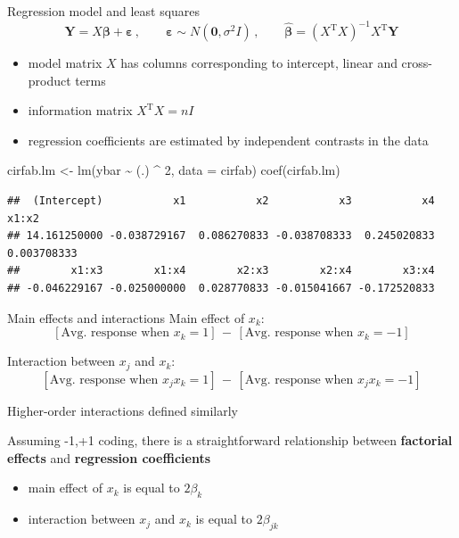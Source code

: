 \documentclass[
  ignorenonframetext,
]{beamer}
\newenvironment{Shaded}{\begin{snugshade}}{\end{snugshade}}
\newcommand{\AttributeTok}[1]{\textcolor[rgb]{0.77,0.63,0.00}{#1}}
\newcommand{\DecValTok}[1]{\textcolor[rgb]{0.00,0.00,0.81}{#1}}
\newcommand{\FunctionTok}[1]{\textcolor[rgb]{0.00,0.00,0.00}{#1}}
\newcommand{\NormalTok}[1]{#1}
\newcommand{\OtherTok}[1]{\textcolor[rgb]{0.56,0.35,0.01}{#1}}
\newcommand{\SpecialCharTok}[1]{\textcolor[rgb]{0.00,0.00,0.00}{#1}}
\providecommand{\tightlist}{%
  \setlength{\itemsep}{0pt}\setlength{\parskip}{0pt}}
\begin{document}
\begin{frame}[fragile]{Regression model and least squares}
\protect\hypertarget{regression-model-and-least-squares}{}
\[
\boldsymbol{Y} = X\boldsymbol{\beta} + \boldsymbol{\varepsilon}\,,\qquad \boldsymbol{\varepsilon}\sim N(\boldsymbol{0}, \sigma^2I)\,,\qquad 
\hat{\boldsymbol{\beta}} = \left(X^\mathrm{T}X\right)^{-1}X^\mathrm{T}\boldsymbol{Y}
\]

\begin{itemize}
\item
  model matrix \(X\) has columns corresponding to intercept, linear and
  cross-product terms
\item
  information matrix \(X^\mathrm{T}X = nI\)
\item
  regression coefficients are estimated by independent contrasts in the
  data
\end{itemize}

\begin{Shaded}
\begin{Highlighting}[]
\NormalTok{cirfab.lm }\OtherTok{\textless{}{-}} \FunctionTok{lm}\NormalTok{(ybar }\SpecialCharTok{\textasciitilde{}}\NormalTok{ (.) }\SpecialCharTok{\^{}} \DecValTok{2}\NormalTok{, }\AttributeTok{data =}\NormalTok{ cirfab)}
\FunctionTok{coef}\NormalTok{(cirfab.lm)}
\end{Highlighting}
\end{Shaded}

\begin{verbatim}
##  (Intercept)           x1           x2           x3           x4        x1:x2 
## 14.161250000 -0.038729167  0.086270833 -0.038708333  0.245020833  0.003708333 
##        x1:x3        x1:x4        x2:x3        x2:x4        x3:x4 
## -0.046229167 -0.025000000  0.028770833 -0.015041667 -0.172520833
\end{verbatim}
\end{frame}

\begin{frame}{Main effects and interactions}
\protect\hypertarget{main-effects-and-interactions}{}
Main effect of \(x_k\): \[
[\text{Avg. response when $x_k = 1$}]\, -\, [\text{Avg. response when $x_k = -1$}]
\]

Interaction between \(x_j\) and \(x_k\): \[
[\text{Avg. response when $x_jx_k= 1$}]\, -\, [\text{Avg. response when $x_jx_k = -1$}]
\]

Higher-order interactions defined similarly

Assuming -1,+1 coding, there is a straightforward relationship between
\textbf{factorial effects} and \textbf{regression coefficients}

\begin{itemize}
\tightlist
\item
  main effect of \(x_k\) is equal to \(2\beta_k\)
\item
  interaction between \(x_j\) and \(x_k\) is equal to \(2\beta_{jk}\)
\end{itemize}
\end{frame}
\end{document}
